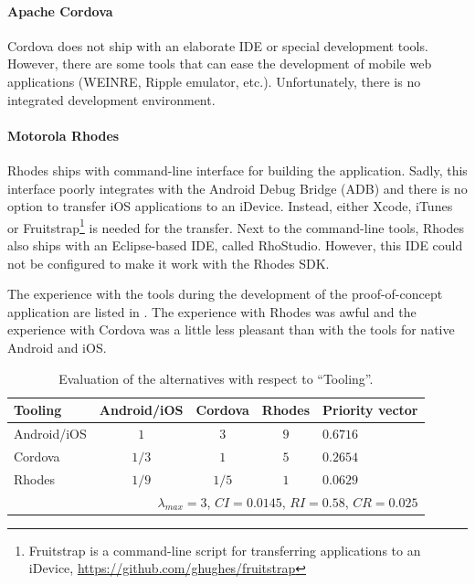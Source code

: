 \paragraph{Apache Cordova} Cordova does not ship with an elaborate IDE or special development tools. However, there are some tools that can ease the development of mobile web applications (WEINRE, Ripple emulator, etc.). Unfortunately, there is no integrated development environment. 

\paragraph{Motorola Rhodes} Rhodes ships with command-line interface for building the application. Sadly, this interface poorly integrates with the  Android Debug Bridge (ADB) and there is no option to transfer iOS applications to an iDevice. Instead, either Xcode, iTunes or Fruitstrap\footnote{Fruitstrap is a command-line script for transferring applications to an iDevice, \url{https://github.com/ghughes/fruitstrap}} is needed for the transfer. Next to the command-line tools, Rhodes also ships with an Eclipse-based IDE, called RhoStudio. However, this IDE could not be configured to make it work with the Rhodes SDK. 

The experience with the tools during the development of the proof-of-concept application are listed in . The experience with Rhodes was awful and the experience with Cordova was a little less pleasant than with the tools for native Android and iOS. 

\begin{table}[h!]
    \centering
    \begin{tabular}{lcccl}
        \hline
        \textbf{Tooling} & Android/iOS & Cordova & Rhodes & Priority vector \\
        \hline
        Android/iOS      & $1$         & $3$     & $9$    & $0.6716$        \\
        Cordova          & $1/3$       & $1$     & $5$    & $0.2654$        \\
        Rhodes           & $1/9$       & $1/5$   & $1$    & $0.0629$        \\
        \hline
        \multicolumn{5}{r}{$\lambda_{max} = 3$, $CI = 0.0145$, $RI = 0.58$, $CR = 0.025$}\\
        \hline
    \end{tabular}
    \caption{Evaluation of the alternatives with respect to ``Tooling''.}
    \label{tab:tooling}
\end{table}

